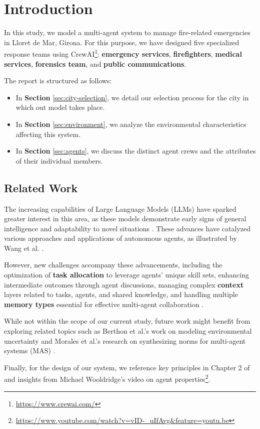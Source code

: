 \section{Introduction}
\label{sec:introduction}

In this study, we model a multi-agent system to manage fire-related emergencies in Lloret de Mar, Girona. For this purpose, we have designed five specialized response teams using CrewAI\footnote{\url{https://www.crewai.com/}}: \textbf{emergency services}, \textbf{firefighters}, \textbf{medical services}, \textbf{forensics team}, and \textbf{public communications}.

The report is structured as follows:
\begin{itemize}
    \item In \textbf{Section} \ref{sec:city-selection}, we detail our selection process for the city in which out model takes place.
    \item In \textbf{Section} \ref{sec:environment}, we analyze the environmental characteristics affecting this system.
    \item In \textbf{Section} \ref{sec:agents}, we discuss the distinct agent crews and the attributes of their individual members.
\end{itemize}

\subsection{Related Work}

The increasing capabilities of Large Language Models (LLMs) have sparked greater interest in this area, as these models demonstrate early signs of general intelligence \cite{bubeck2023sparksartificialgeneralintelligence} and adaptability to novel situations \cite{HAUPTMAN2023107451}. These advances have catalyzed various approaches and applications of autonomous agents, as illustrated by Wang et al. \cite{Wang_2024}.

However, new challenges accompany these advancements, including the optimization of \textbf{task allocation} to leverage agents' unique skill sets, enhancing intermediate outcomes through agent discussions, managing complex \textbf{context} layers related to tasks, agents, and shared knowledge, and handling multiple \textbf{memory types} essential for effective multi-agent collaboration \cite{han2024llmmultiagentsystemschallenges}.

While not within the scope of our current study, future work might benefit from exploring related topics such as Berthon et al.'s work on modeling environmental uncertainty \cite{berthon2024naturalstrategicabilitystochastic} and Morales et al.'s research on synthesizing norms for multi-agent systems (MAS) \cite{morales2017synthesisingevolutionarilystablenormative}.

Finally, for the design of our system, we reference key principles in Chapter 2 of \cite{wooldridge2009introduction} and insights from Michael Wooldridge's video on agent properties\footnote{\url{https://www.youtube.com/watch?v=vID-_uIfAvg&feature=youtu.be}}.


